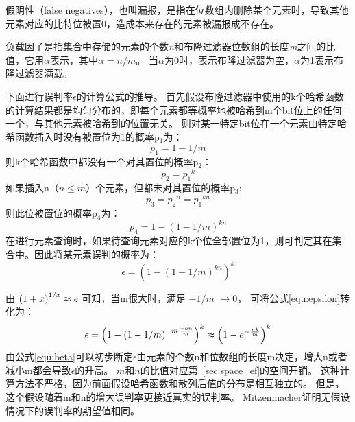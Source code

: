 \begin{definition}
	假阴性（false negatives），也叫漏报，是指在位数组内删除某个元素时，导致其他元素对应的比特位被置0，造成本来存在的元素被漏报成不存在。
\end{definition}

\begin{definition}
	负载因子是指集合中存储的元素的个数\textit{n}和布隆过滤器位数组的长度\textit{m}之间的比值，它用$ \alpha $表示，其中$ \alpha  = {n/m} $。
  当$\alpha $为0时，表示布隆过滤器为空，$ \alpha $为1表示布隆过滤器满载。
\end{definition}

下面进行误判率$\epsilon$的计算公式的推导。
首先假设布隆过滤器中使用的k个哈希函数的计算结果都是均匀分布的，即每个元素都等概率地被哈希到m个bit位上的任何一个，与其他元素被哈希到的位置无关。
则对某一特定bit位在一个元素由特定哈希函数插入时没有被置位为1的概率p$_1$为：
\begin{equation}
p_1 = 1-{1/m}
\end{equation}
则k个哈希函数中都没有一个对其置位的概率p$_2$：
\begin{equation}
p_2 = {p_1}^k
\end{equation}
如果插入n（$n\leqslant m$）个元素，但都未对其置位的概率p$_3$:
\begin{equation}
p_3 = {p_2}^n = {p_1}^{kn}
\end{equation}
则此位被置位的概率p$_4$为：
\begin{equation}
p_4 = 1 - \left(1 - {1/m}\right)^{kn}
\label{equ:alpha}
\end{equation}
在进行元素查询时，如果待查询元素对应的k个位全部置位为1，则可判定其在集合中。因此将某元素误判的概率为：
\begin{equation}
\epsilon = \left(1 - \left(1 - {1/m}\right)^{kn}\right)^k
\label{equ:epsilon}
\end{equation}


由
$ \left(1 + x\right)^{{1/x}} \thickapprox e $
可知，当m很大时，满足
$-{1/m}$ $\to 0$，
可将公式\ref{equ:epsilon}转化为：
\begin{equation}
\epsilon = \left(1 - \left(1 - {1/m}\right)^{{-m}\frac{-kn}{m}}\right)^k \thickapprox \left(1 - e^{-\frac{nk}{m}}\right)^k
\label{equ:beta}
\end{equation}
由公式\ref{equ:beta}可以初步断定$\epsilon$由元素的个数n和位数组的长度m决定，增大n或者减小m都会导致$\epsilon$的升高。
$m$和$n$的比值对应第~\ref{sec:space_ef}的空间开销。
这种计算方法不严格，因为前面假设哈希函数和散列后值的分布是相互独立的。
但是，这个假设随着m和n的增大误判率更接近真实的误判率。
Mitzenmacher证明无假设情况下的误判率的期望值相同\cite{mitzenmacher2002compressed}。

